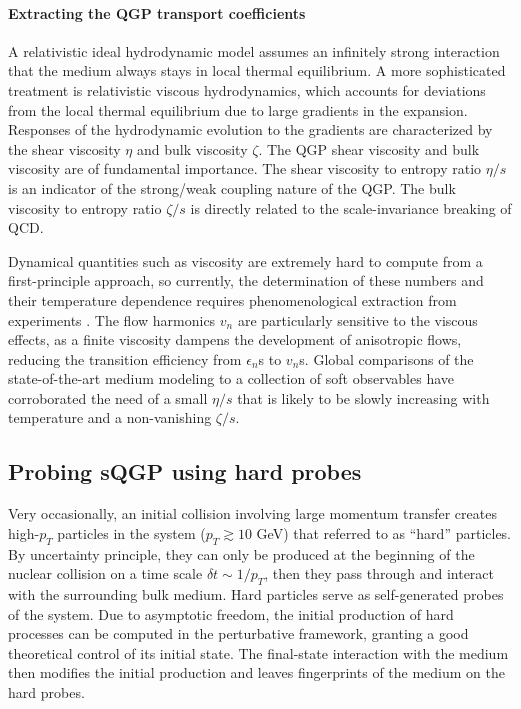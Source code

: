 \paragraph{Extracting the QGP transport coefficients}
A relativistic ideal hydrodynamic model assumes an infinitely strong interaction that the medium always stays in local thermal equilibrium.
A more sophisticated treatment is relativistic viscous hydrodynamics, which accounts for deviations from the local thermal equilibrium due to large gradients in the expansion.
Responses of the hydrodynamic evolution to the gradients are characterized by the shear viscosity $\eta$ and bulk viscosity $\zeta$.
The QGP shear viscosity and bulk viscosity are of fundamental importance. 
The shear viscosity to entropy ratio $\eta/s$ is an indicator of the strong/weak coupling nature of the QGP. 
The bulk viscosity to entropy ratio $\zeta/s$ is directly related to the scale-invariance breaking of QCD.

Dynamical quantities such as viscosity are extremely hard to compute from a first-principle approach, so currently, the determination of these numbers and their temperature dependence requires phenomenological extraction from experiments \cite{Muronga:2004sf, Chaudhuri:2006jd, Romatschke:2007mq, Dusling:2007gi, Song:2007ux, Luzum:2008cw}.
The flow harmonics $v_n$ are particularly sensitive to the viscous effects, as a finite viscosity dampens the development of anisotropic flows, reducing the transition efficiency from $\epsilon_n$s to $v_n$s.
Global comparisons of the state-of-the-art medium modeling to a collection of soft observables have corroborated the need of a small $\eta/s$ that is likely to be slowly increasing with temperature and a non-vanishing $\zeta/s$.

\subsection{Probing sQGP using hard probes}
Very occasionally, an initial collision involving large momentum transfer creates high-$p_T$ particles in the system ($p_T\gtrsim 10$ GeV) that referred to as ``hard'' particles.
By uncertainty principle, they can only be produced at the beginning of the nuclear collision on a time scale $\delta t \sim 1/p_T$, then they pass through and interact with the surrounding bulk medium.
Hard particles serve as self-generated probes of the system.
Due to asymptotic freedom, the initial production of hard processes can be computed in the perturbative framework, granting a good theoretical control of its initial state.
The final-state interaction with the medium then modifies the initial production and leaves fingerprints of the medium on the hard probes.

